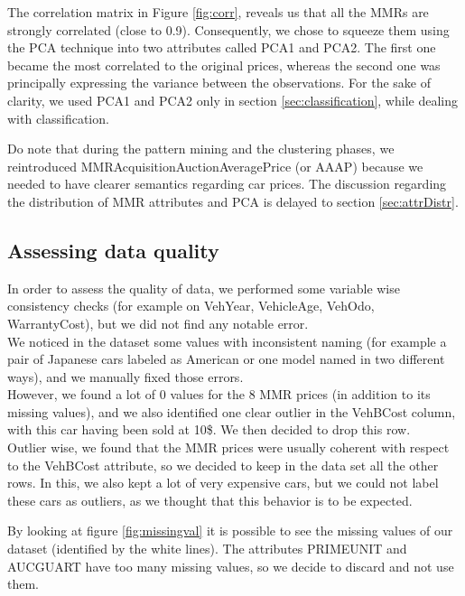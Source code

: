 \documentclass{article}
\begin{document}
	The correlation matrix in Figure \ref{fig:corr}, reveals us that all the MMRs are strongly correlated (close to 0.9). Consequently, we chose to squeeze them using the PCA technique into two attributes called PCA1 and PCA2. The first one became the most correlated to the original prices, whereas the second one was principally expressing the variance between the observations. For the sake of clarity, we used PCA1 and PCA2 only in section \ref{sec:classification}, while dealing with classification.
	
	Do note that during the pattern mining and the clustering phases, we reintroduced MMRAcquisitionAuctionAveragePrice (or AAAP) because we needed to have clearer semantics regarding car prices. The discussion regarding the distribution of MMR attributes and PCA is delayed to section \ref{sec:attrDistr}.
	
	
	\subsection{Assessing data quality}
	
	In order to assess the quality of data, we performed some variable wise consistency checks (for example on VehYear, VehicleAge, VehOdo, WarrantyCost), but we did not find any notable error.\\
	We noticed in the dataset some values with inconsistent naming (for example a pair of Japanese cars labeled as American or one model named in two different ways), and we manually fixed those errors.\\ 
	However, we found a lot of 0 values for the 8 MMR prices (in addition to its missing values), and we also identified one clear outlier in the VehBCost column, with this car having been sold at 10\$. We then decided to drop this row. \\
	Outlier wise, we found that the MMR prices were usually coherent with respect to the VehBCost attribute, so we decided to keep in the data set all the other rows. In this, we also kept a lot of very expensive cars, but we could not label these cars as outliers, as we thought that this behavior is to be expected.
	
	By looking at figure \ref{fig:missingval} it is possible to see the missing values of our dataset (identified by the white lines). The attributes PRIMEUNIT and AUCGUART have too many missing values, so we decide to discard and not use them.\\
	
\end{document}
